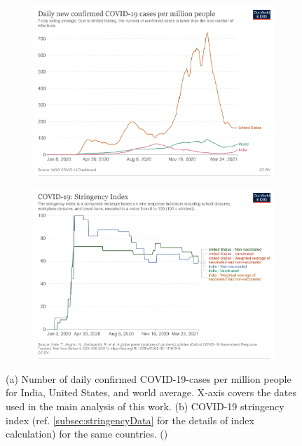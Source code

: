 \documentclass[12pt,a4paper,notitlepage]{article}
\begin{document}
\begin{figure}
\begin{subfigure}{.49\textwidth}
\centering
\includegraphics[width=1\linewidth]{confirmedCases}
\caption{ \label{fig:confirmedCases}}
\end{subfigure}
\begin{subfigure}{.49\textwidth}
\centering
\includegraphics[width=1\linewidth]{stringency}
\caption{ \label{fig:stringencyCases}}
\end{subfigure}
\caption{\label{fig:indiaCovid} (a) Number of daily confirmed COVID-19-cases per million people for India, United States, and world average. X-axis covers the dates used in the main analysis of this work. (b) COVID-19 stringency index (ref. \cref{subsec:stringencyData} for the details of index calculation) for the same countries. (\citet{Mathieu2020})}
\end{figure}
\end{document}
